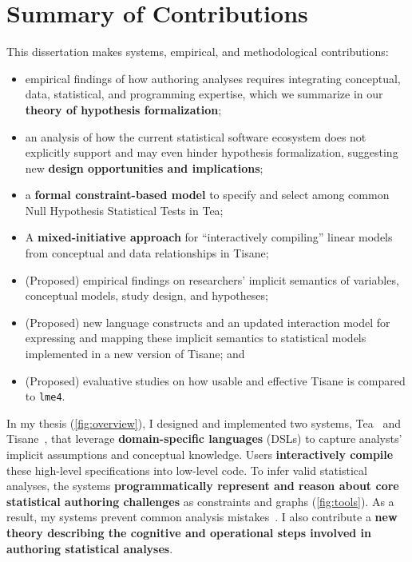 \section*{Summary of Contributions} 
This dissertation makes systems, empirical, and methodological contributions:
\begin{itemize} 
    \item empirical findings of how authoring analyses requires integrating
    conceptual, data, statistical, and programming expertise, which we summarize
    in our \textbf{theory of hypothesis formalization}; 
    \item an analysis of how the current statistical software ecosystem does not
    explicitly support and may even hinder hypothesis formalization, suggesting
    new \textbf{design opportunities and implications};
    \item a \textbf{formal constraint-based model} to specify and select among
    common Null Hypothesis Statistical Tests in Tea; 
    \item A \textbf{mixed-initiative approach} for ``interactively compiling''
    linear models from conceptual and data relationships in Tisane; 
    \item (Proposed) empirical findings on researchers' implicit semantics of
    variables, conceptual models, study design, and hypotheses; 
    \item (Proposed) new language constructs and an updated interaction model
    for expressing and mapping these implicit semantics to statistical models
    implemented in a new version of Tisane; and
    \item (Proposed) evaluative studies on how usable and effective Tisane is
    compared to \texttt{lme4}.
\end{itemize}

In my thesis (\autoref{fig:overview}), I designed and implemented two systems,
Tea~\cite{jun2019tea} and Tisane~\cite{jun2022tisane}, that leverage
\textbf{domain-specific languages} (DSLs) to capture analysts' implicit
assumptions and conceptual knowledge. Users \textbf{interactively compile} these
high-level specifications into low-level code. To infer valid statistical
analyses, the systems \textbf{programmatically represent and reason about core
statistical authoring challenges} as constraints and graphs
(\autoref{fig:tools}). As a result, my systems prevent common analysis
mistakes~\cite{jun2019tea,jun2022tisane}. I also contribute a \textbf{new theory
describing the cognitive and operational steps involved in authoring statistical
analyses}.


